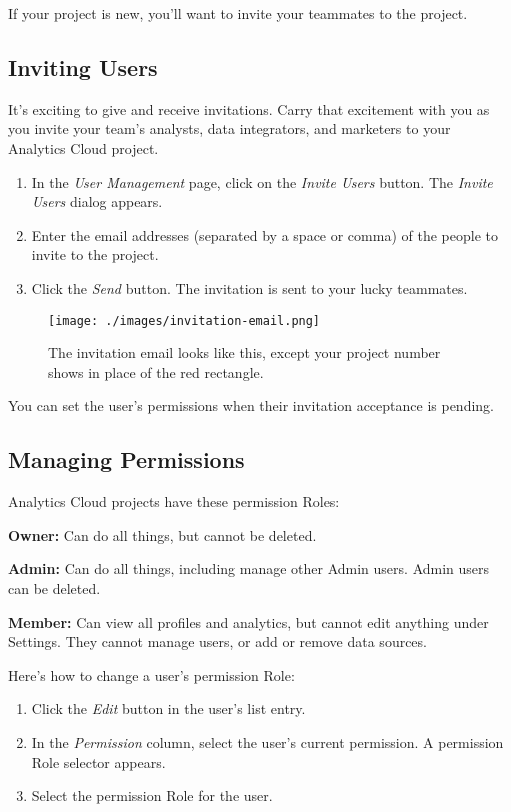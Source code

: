 If your project is new, you'll want to invite your teammates to the
project.

\subsection{Inviting Users}\label{inviting-users}

It's exciting to give and receive invitations. Carry that excitement
with you as you invite your team's analysts, data integrators, and
marketers to your Analytics Cloud project.

\begin{enumerate}
\def\labelenumi{\arabic{enumi}.}
\item
  In the \emph{User Management} page, click on the \emph{Invite Users}
  button. The \emph{Invite Users} dialog appears.
\item
  Enter the email addresses (separated by a space or comma) of the
  people to invite to the project.
\item
  Click the \emph{Send} button. The invitation is sent to your lucky
  teammates.
\end{enumerate}

\begin{figure}
\centering
\texttt{[image: ./images/invitation-email.png]}
\caption{The invitation email looks like this, except your project
number shows in place of the red rectangle.}
\end{figure}

You can set the user's permissions when their invitation acceptance is
pending.

\subsection{Managing Permissions}\label{managing-permissions}

Analytics Cloud projects have these permission Roles:

\textbf{Owner:} Can do all things, but cannot be deleted.

\textbf{Admin:} Can do all things, including manage other Admin users.
Admin users can be deleted.

\textbf{Member:} Can view all profiles and analytics, but cannot edit
anything under Settings. They cannot manage users, or add or remove data
sources.

Here's how to change a user's permission Role:

\begin{enumerate}
\def\labelenumi{\arabic{enumi}.}
\item
  Click the \emph{Edit} button in the user's list entry.
\item
  In the \emph{Permission} column, select the user's current permission.
  A permission Role selector appears.
\item
  Select the permission Role for the user.
\end{enumerate}

